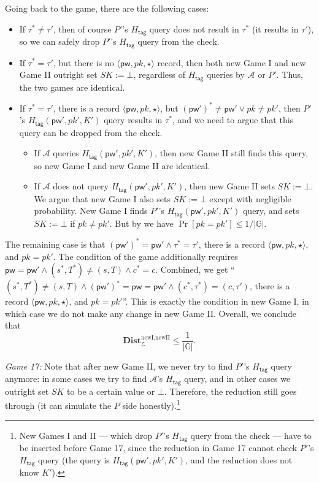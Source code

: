 \documentclass{article}
\theoremstyle{plain}
\theoremstyle{definition}
\theoremstyle{remark}
\newcommand{\group}{\mathbb{G}}
\newcommand{\adv}{\mathcal{A}}
\newcommand{\env}{\mathcal{Z}}
\newcommand{\Dist}{\mathbf{Dist}}
\newcommand{\Htag}{H_\mathsf{tag}}
\newcommand{\pw}{\mathsf{pw}}
\begin{document}
{Going back to the game, there are the following cases:
\begin{itemize}
  \item If $\tau^* \neq \tau'$, then of course $P'$'s $\Htag$ query does not result in $\tau^*$ (it results in $\tau'$), so we can safely drop $P'$'s $\Htag$ query from the check.
  \item If $\tau^* = \tau'$, but there is no $\langle\pw,pk,\star\rangle$ record, then both new Game I and new Game II outright set $SK := \bot$, regardless of $\Htag$ queries by $\adv$ or $P'$. Thus, the two games are identical.
  \item If $\tau^* = \tau'$, there is a record $\langle\pw,pk,\star\rangle$, but $(\pw')^* \neq \pw' \lor pk \neq pk'$, then $P'$'s $\Htag(\pw',pk',K')$ query results in $\tau^*$, and we need to argue that this query can be dropped from the check. 
      \begin{itemize}
        \item If $\adv$ queries $\Htag(\pw',pk',K')$, then new Game II still finds this query, so new Game I and new Game II are identical.
        \item If $\adv$ does not query $\Htag(\pw',pk',K')$, then new Game II sets $SK := \bot$. We argue that new Game I also sets $SK := \bot$ except with negligible probability. New Game I finds $P'$'s $\Htag(\pw',pk',K')$ query, and sets $SK := \bot$ if $pk \neq pk'$. But by  we have $\Pr[pk = pk'] \leq 1/|\group|$.
      \end{itemize}
\end{itemize}

The remaining case is that $(\pw')^* = \pw' \land \tau^* = \tau'$, there is a record $\langle\pw,pk,\star\rangle$, and $pk = pk'$. The condition of the game additionally requires $\pw = \pw' \land (s^*,T^*) \neq (s,T) \land c^* = c$. Combined, we get ``$(s^*,T^*) \neq (s,T) \land (\pw')^* = \pw = \pw' \land (c^*,\tau^*) = (c,\tau')$, there is a record $\langle\pw,pk,\star\rangle$, and $pk = pk'$''. This is exactly the condition in new Game I, in which case we do not make any change in new Game II. Overall, we conclude that
\[
\Dist_\env^{\text{newI},\text{newII}} \leq \frac{1}{|\group|}.
\]}

\noindent\emph{Game 17:} Note that after new Game II, we never try to find $P'$'s $\Htag$ query anymore: in some cases we try to find $\adv$'s $\Htag$ query, and in other cases we outright set $SK$ to be a certain value or $\bot$. Therefore, the reduction still goes through (it can simulate the $P$ side honestly).\footnote{New Games I and II --- which drop $P'$'s $\Htag$ query from the check --- have to be inserted before Game 17, since the reduction in Game 17 cannot check $P'$'s $\Htag$ query (the query is $\Htag(\pw',pk',K')$, and the reduction does not know $K'$).}
\end{document}
